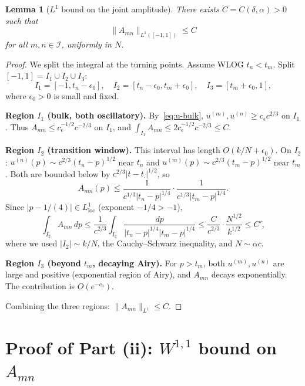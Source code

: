 \documentclass[12pt,a4paper]{amsart}
\newtheorem{lemma}[theorem]{Lemma}
\theoremstyle{definition}
\newcommand{\norm}[1]{\|#1\|}
\newcommand{\dd}{\,d}
\begin{document}
\begin{lemma}[$L^1$ bound on the joint amplitude]\label{lem:L1}
There exists $C = C(\delta, \alpha) > 0$ such that
\[
  \norm{A_{mn}}_{L^1([-1,1])} \leq C
\]
for all $m, n \in \mathcal{I}$, uniformly in $N$.
\end{lemma}

\begin{proof}
We split the integral at the turning points.
Assume WLOG $t_n < t_m$. Split $[-1,1] = I_1 \cup I_2 \cup I_3$:
\[
  I_1 = [-1, t_n - \epsilon_0], \quad
  I_2 = [t_n - \epsilon_0, t_m + \epsilon_0], \quad
  I_3 = [t_m + \epsilon_0, 1],
\]
where $\epsilon_0 > 0$ is small and fixed.

\medskip
\noindent\textbf{Region $I_1$ (bulk, both oscillatory).}
By~\eqref{eq:u-bulk}, $u^{(m)}, u^{(n)} \geq c_\epsilon c^{2/3}$ on $I_1$.
Thus $A_{mn} \leq c_\epsilon^{-1/2} c^{-2/3}$ on $I_1$, and
$\int_{I_1} A_{mn} \leq 2 c_\epsilon^{-1/2} c^{-2/3} \leq C$.

\medskip
\noindent\textbf{Region $I_2$ (transition window).}
This interval has length $O(k/N + \epsilon_0)$.
On $I_2$: $u^{(n)}(p) \sim c^{2/3}(t_n - p)^{1/2}$ near $t_n$
and $u^{(m)}(p) \sim c^{2/3}(t_m - p)^{1/2}$ near $t_m$.
Both are bounded below by $c^{2/3}|t - t_{\cdot}|^{1/2}$,
so
\[
  A_{mn}(p) \leq
  \frac{1}{c^{1/3}|t_n - p|^{1/4}} \cdot
  \frac{1}{c^{1/3}|t_m - p|^{1/4}}.
\]
Since $|p - 1/(4)| \in L^1_\mathrm{loc}$ (exponent $-1/4 > -1$),
\[
  \int_{I_2} A_{mn}\dd p
  \leq \frac{1}{c^{2/3}}\int_{I_2}
  \frac{dp}{|t_n - p|^{1/4}|t_m - p|^{1/4}}
  \leq \frac{C}{c^{2/3}} \cdot \frac{N^{1/2}}{k^{1/2}} \leq C',
\]
where we used $|I_2| \sim k/N$, the Cauchy--Schwarz inequality,
and $N \sim \alpha c$.

\medskip
\noindent\textbf{Region $I_3$ (beyond $t_m$, decaying Airy).}
For $p > t_m$, both $u^{(m)}, u^{(n)}$ are large and positive
(exponential region of Airy), and $A_{mn}$ decays exponentially.
The contribution is $O(e^{-c_0})$.

Combining the three regions: $\norm{A_{mn}}_{L^1} \leq C$.
\end{proof}

\section{Proof of Part (ii): $W^{1,1}$ bound on $A_{mn}$}
\label{sec:W11}
\end{document}
